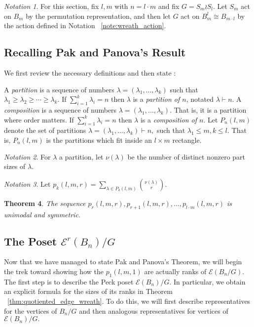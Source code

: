 \documentclass[10 pt]{amsart}
\theoremstyle{plain}
\newtheorem{thm}{Theorem}[section]
\theoremstyle{definition}
\theoremstyle{remark}
\newtheorem{note}[thm]{Notation}
\numberwithin{equation}{section}
\newcommand\ssec{\subsection}
\begin{document}
\begin{note}
For this section, fix $l,m$ with $n = l \cdot m$ and fix $G = S_m \wr S_l.$ Let $S_m$ act on $B_m$ by the permutation representation, and then let $G$ act on $B_{m}^l\cong B_{m \cdot l}$ by the action defined in Notation ~\ref{note:wreath_action}.
\end{note}

\ssec{Recalling Pak and Panova's Result}
We first review the necessary definitions and then state \cite[Theorem 1.1]{pak}:

A {\it partition} is a sequence of numbers $\lambda = (\lambda_1,\ldots, \lambda_k)$ such that $\lambda_1 \geq \lambda_2 \geq \cdots \geq \lambda_k.$ If $\sum_{i=1}^k \lambda_i = n$ then $\lambda$ is a {\it partition of $n$}, notated $\lambda \vdash n.$ A {\it composition} is a sequence of numbers $\lambda = (\lambda_1,\ldots, \lambda_k).$ That is, it is a partition where order matters. If $\sum_{i=1}^k \lambda_i = n$ then $\lambda$ is a {\it composition of $n$}. Let $P_n(l,m)$ denote the set of partitions $\lambda = (\lambda_1,\ldots, \lambda_k) \vdash n,$ such that $\lambda_1 \leq m,k \leq l.$ That is, $P_n(l,m)$ is the partitions which fit inside an $l \times m$ rectangle.

\begin{note}
\cite[Section 1]{pak} For $\lambda$ a partition, let $\nu(\lambda)$ be the number of distinct nonzero part sizes of $\lambda.$
\end{note}

\begin{note}
\cite[Section 1]{pak}
Let $p_k(l,m,r) = \sum_{\lambda \in P_k(l,m)} \binom{\nu(\lambda)}{r}.$
\end{note}

\begin{thm}
\label{thm:pak_thm}
\cite[Theorem 1.1]{pak}
The sequence $p_r(l,m,r), p_{r+1}(l,m,r),\ldots, p_{l\cdot m}(l,m,r)$ is unimodal and symmetric.
\end{thm}

\ssec{The Poset $\mathcal E^r(B_n)/G$}
Now that we have managed to state Pak and Panova's Theorem, we will begin the trek toward showing how the $p_1(l,m,1)$ are actually ranks of $\mathcal E(B_n/G).$ The first step is to describe the Peck poset $\mathcal E(B_n)/G.$ In particular, we obtain an explicit formula for the sizes of its ranks in Theorem ~\ref{thm:quotiented_edge_wreath}. To do this, we will first describe representatives for the vertices of $B_n/G$ and then analogous representatives for vertices of $\mathcal E(B_n)/G.$
\end{document}
